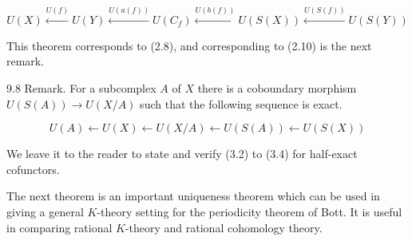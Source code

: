 $$U(X) \xleftarrow{U(f)} U(Y) \xleftarrow{U(a(f))} U(C_f) \xleftarrow{U(b(f))} U(S(X)) \xleftarrow{U(S(f))} U(S(Y))$$

This theorem corresponds to (2.8), and corresponding to (2.10) is the next remark.

9.8 Remark. For a subcomplex $A$ of $X$ there is a coboundary morphism $U(S(A)) \rightarrow U(X/A)$ such that the following sequence is exact.

$$U(A) \leftarrow U(X) \leftarrow U(X/A) \leftarrow U(S(A)) \leftarrow U(S(X))$$

We leave it to the reader to state and verify (3.2) to (3.4) for half-exact cofunctors.

The next theorem is an important uniqueness theorem which can be used in giving a general $K$-theory setting for the periodicity theorem of Bott. It is useful in comparing rational $K$-theory and rational cohomology theory.
